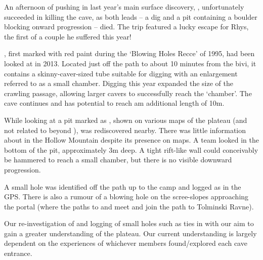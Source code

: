 
An afternoon of pushing in last year's main surface discovery, , unfortunately succeeded in killing the cave, as both leads – a dig and a pit containing a boulder blocking onward progression – died. The trip featured a lucky escape for Rhys, the first of a couple he suffered this year!

, first marked with red paint during the `Blowing Holes Recce' of 1995, had been looked at in 2013. Located just off the path to  about 10 minutes from the bivi, it contains a skinny-caver-sized tube suitable for digging with an enlargement referred to as a small chamber. Digging this year expanded the size of the crawling passage, allowing larger cavers to successfully reach the `chamber'. The cave continues and  has potential to reach am additional length of 10m.

While looking at  a pit marked as , shown on various maps of the plateau (and not related to  beyond ), was rediscovered nearby. There was little information about  in the Hollow Mountain despite its presence on maps. A team looked in the bottom of the pit, approximately 3m deep. A tight rift-like wall could conceivably be hammered to reach a small chamber, but there is no visible downward progression. 

A small hole was identified off the path up to the camp and logged as  in the GPS. There is also a rumour of a blowing hole on the scree-slopes approaching the portal (where the paths to  and  meet and join the path to Tolminski Ravne).


Our re-investigation of  and logging of small holes such as  ties in with our aim to gain a greater understanding of the plateau. Our current understanding is largely dependent on the experiences of whichever members found/explored each cave entrance.

